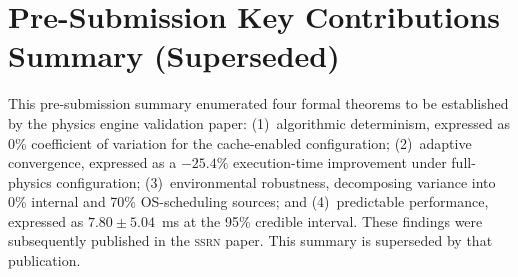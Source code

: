 
\section*{Pre-Submission Key Contributions Summary (Superseded)}

This pre-submission summary enumerated four formal theorems to be established
by the physics engine validation paper: (1)~algorithmic determinism, expressed
as 0\% coefficient of variation for the cache-enabled configuration;
(2)~adaptive convergence, expressed as a \mbox{$-25.4\%$} execution-time
improvement under full-physics configuration; (3)~environmental robustness,
decomposing variance into 0\% internal and 70\% OS-scheduling sources; and
(4)~predictable performance, expressed as $7.80 \pm 5.04$~ms at the 95\%
credible interval. These findings were subsequently published in the
\textsc{ssrn} paper. This summary is superseded by that publication.
